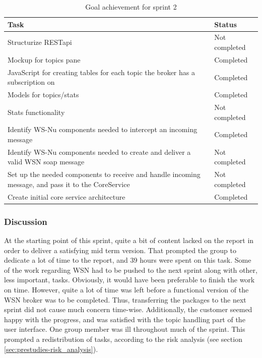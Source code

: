 \begin{table}[H]
\small
\centering
\begin{tabular}{ | p{10cm} | p{2cm} |}
\hline
\rowcolor{lightgray}
 \textbf{Task} & \textbf{Status} \\
\hline
\rowcolor{orange!40}
Structurize RESTapi & Not completed \\
\rowcolor{green!30}
Mockup for topics pane & Completed \\
\rowcolor{green!30}
JavaScript for creating tables for each topic the broker has a subscription on & Completed \\
\rowcolor{green!30}
Models for topics/stats & Completed \\
\rowcolor{orange!40}
Stats functionality	& Not completed \\
\rowcolor{green!30}
Identify WS-Nu components needed to intercept an incoming message & Completed \\
\rowcolor{orange!40}
Identify WS-Nu components needed to create and deliver a valid WSN soap message & Not completed \\
\rowcolor{orange!40}
Set up the needed components to receive and handle incoming message, and pass it to the CoreService	& Not completed \\
\rowcolor{green!30}
Create initial core service architecture & Completed \\
\hline
\end{tabular}
\caption{Goal achievement for sprint 2}
\label{tab:sprint 2, goals}
\end{table}

\subsubsection{Discussion}
\label{subsec:project_lifecycle-development-sprint_2-discussion}

At the starting point of this sprint, quite a bit of content lacked on the report in order to deliver a satisfying mid term version. That prompted the group to dedicate a lot of time to the report, and 39 hours were spent on this task. Some of the work regarding WSN had to be pushed to the next sprint along with other, less important, tasks. Obviously, it would have been preferable to finish the work on time. However, quite a lot of time was left before a functional version of the WSN broker was to be completed. Thus, transferring the packages to the next sprint did not cause much concern time-wise. Additionally, the customer seemed happy with the progress, and was satisfied with the topic handling part of the user interface. One group member was ill throughout much of the sprint. This prompted a redistribution of tasks, according to the risk analysis (see section \ref{sec:prestudies-risk_analysis}).

